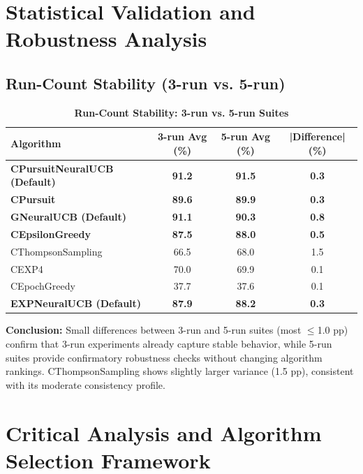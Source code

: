 \documentclass[12pt,a4paper]{article}
\newcommand{\success}[1]{\textcolor{successcolor}{\textbf{#1}}}
\newcommand{\legacy}[1]{\textcolor{legacycolor}{\textbf{#1}}}
\newcommand{\neural}[1]{\textcolor{neuralcolor}{\textbf{#1}}}
\begin{document}
\section{Statistical Validation and Robustness Analysis}

\subsection{Run-Count Stability (3-run vs. 5-run)}

\begin{table}[H]
\centering
\caption{\success{Run-Count Stability: 3-run vs. 5-run Suites}}
\begin{tabular}{|l|c|c|c|}
\hline
\textbf{Algorithm} & \textbf{3-run Avg (\%)} & \textbf{5-run Avg (\%)} & \textbf{|Difference| (\%)} \\
\hline
\hline
\neural{CPursuitNeuralUCB (Default)}  & \neural{91.2}     & \neural{91.5}     & \neural{0.3} \\
\success{CPursuit}                    & \success{89.6}     & \success{89.9}     & \success{0.3} \\
\neural{GNeuralUCB (Default)}         & \neural{91.1}     & \neural{90.3}     & \neural{0.8} \\
\success{CEpsilonGreedy}              & \success{87.5}     & \success{88.0}     & \success{0.5} \\
CThompsonSampling                     & 66.5              & 68.0              & 1.5 \\
CEXP4                                 & 70.0              & 69.9              & 0.1 \\
CEpochGreedy                          & 37.7              & 37.6              & 0.1 \\
\legacy{EXPNeuralUCB (Default)}       & \legacy{87.9}     & \legacy{88.2}     & \legacy{0.3} \\
\hline
\end{tabular}
\end{table}

\textbf{Conclusion:} Small differences between 3-run and 5-run suites (most $\leq$1.0 pp) confirm that 3-run experiments already capture stable behavior, while 5-run suites provide confirmatory robustness checks without changing algorithm rankings. CThompsonSampling shows slightly larger variance (1.5 pp), consistent with its moderate consistency profile.

\section{Critical Analysis and Algorithm Selection Framework}
\end{document}
